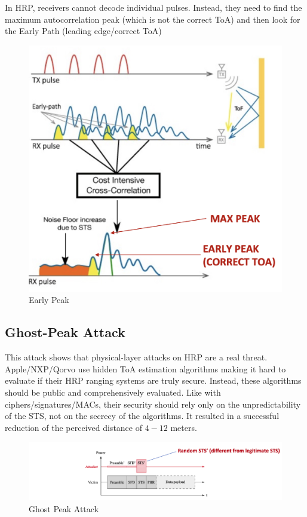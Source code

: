 In HRP, receivers cannot decode individual pulses. Instead, they need to find the maximum autocorrelation peak (which is not the correct ToA) and then look for the Early Path (leading edge/correct ToA)
\begin{figure}[h]
	\centering
	\includegraphics[scale=0.3]{images/5-early-peak.png}
	\caption{Early Peak}%
	\label{fig:earlypeak}
\end{figure}

\subsection{Ghost-Peak Attack}
This attack shows that physical-layer attacks on HRP are a real threat. Apple/NXP/Qorvo use hidden ToA estimation algorithms making it hard to evaluate if their HRP ranging systems are truly secure. Instead, these algorithms should be public and comprehensively evaluated.
Like with ciphers/signatures/MACs, their security should rely only on the unpredictability of the STS, not on the secrecy of the algorithms.
It resulted in a successful reduction of the perceived distance of $4-12$ meters.

\begin{figure}[h]
	\centering
	\includegraphics[scale=0.45]{images/5-ghost-peak.png}
	\caption{Ghost Peak Attack}%
	\label{fig:ghostpeak}
\end{figure}

